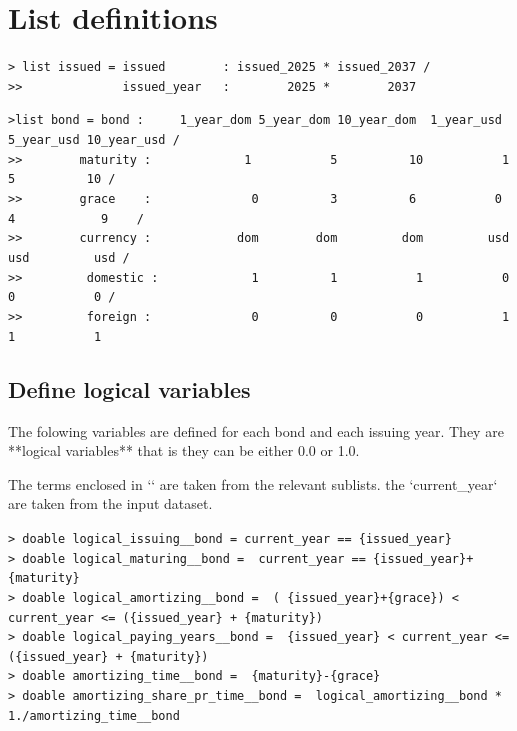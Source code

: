 \documentclass{article}
\begin{document}
\section{List definitions}


\par\noindent
\verb|> list issued = issued        : issued_2025 * issued_2037 /|\\
\verb|>>              issued_year   :        2025 *        2037|\\
\par

\par\noindent
\verb|>list bond = bond :     1_year_dom 5_year_dom 10_year_dom  1_year_usd 5_year_usd 10_year_usd /|\\
\verb|>>        maturity :             1           5          10           1          5          10 /|\\
\verb|>>        grace    :              0          3          6           0         4            9    /|\\
\verb|>>        currency :            dom        dom         dom         usd        usd         usd /|\\
\verb|>>         domestic :             1          1           1           0          0           0 /|\\
\verb|>>         foreign :              0          0           0           1          1           1|\\
\par

\subsection{Define logical variables}
The folowing variables are defined for each bond and each issuing year. They are **logical variables** that is they can be either 0.0 or 1.0.

The terms enclosed in `{}` are taken from the relevant sublists. the  `current_year` are taken from the input dataset.

\par\noindent
\verb|> doable logical_issuing__bond = current_year == {issued_year}|\\
\verb|> doable logical_maturing__bond =  current_year == {issued_year}+{maturity}|\\
\verb|> doable logical_amortizing__bond =  ( {issued_year}+{grace}) < current_year <= ({issued_year} + {maturity})|\\
\verb|> doable logical_paying_years__bond =  {issued_year} < current_year <= ({issued_year} + {maturity})|\\
\verb|> doable amortizing_time__bond =  {maturity}-{grace}|\\
\verb|> doable amortizing_share_pr_time__bond =  logical_amortizing__bond * 1./amortizing_time__bond|\\
\par
\end{document}
